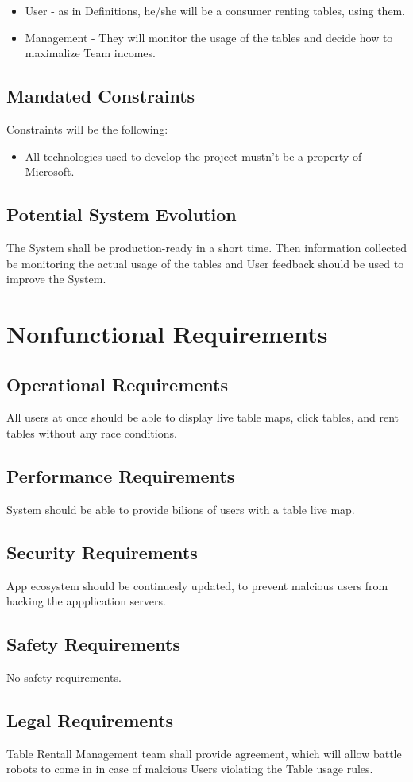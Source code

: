\documentclass[14pt]{extarticle}
\begin{document}
\begin{itemize}
    \item User - as in Definitions, he/she will be a consumer renting tables, using them.
    \item Management - They will monitor the usage of the tables and decide how to maximalize Team incomes.
\end{itemize}
\subsection{Mandated Constraints}
Constraints will be the following:

\begin{itemize}
    \item All technologies used to develop the project mustn't be a property of Microsoft.
\end{itemize}
\subsection{Potential System Evolution}
The System shall be production-ready in a short time. Then information collected be monitoring the actual usage of the tables and User feedback should be used to improve the System.
\section{Nonfunctional Requirements}
\subsection{Operational Requirements}
All users at once should be able to display live table maps, click tables, and rent tables without any race conditions.
\subsection{Performance Requirements}
System should be able to provide bilions of users with a table live map.
\subsection{Security Requirements}
App ecosystem should be continuesly updated, to prevent malcious users from hacking the appplication servers.
\subsection{Safety Requirements}
No safety requirements.
\subsection{Legal Requirements}
Table Rentall Management team shall provide agreement, which will allow battle robots to come in in case of malcious Users violating the Table usage rules.
\end{document}
